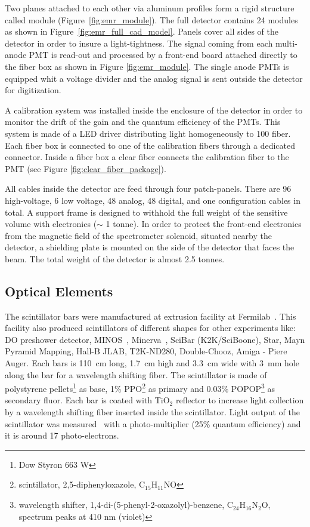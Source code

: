 \documentclass[a4paper,11pt]{article}
\begin{document}
Two planes attached to each other via aluminum profiles form a rigid structure called module (Figure~\ref{fig:emr_module}). 
The full detector contains 24 modules as shown in Figure~\ref{fig:emr_full_cad_model}. Panels cover all sides of the detector
in order to insure a light-tightness. The signal coming from each multi-anode PMT is read-out and processed by a front-end board
attached directly to the fiber box as shown in Figure \ref{fig:emr_module}. The single anode PMTs is equipped whit a
voltage divider and the analog signal is sent outside the detector for digitization.

A calibration system was installed inside the enclosure of the detector in order to monitor the drift of the gain and the quantum
efficiency of the PMTs. This system is made of a LED driver distributing light homogeneously to 100 fiber. Each fiber box is
connected to one of the calibration fibers through a dedicated connector. Inside a fiber box a clear fiber connects the calibration
fiber to the PMT (see Figure \ref{fig:clear_fiber_package}).

All cables inside the detector are feed through four patch-panels. There are 96 high-voltage, 6 low voltage, 48 analog, 48 digital,
and one configuration cables in total. A support frame is designed to withhold the full weight of the sensitive volume with electronics
($\sim$ 1 tonne). In order to protect the front-end electronics from the magnetic field of the spectrometer solenoid, situated nearby
the detector, a shielding plate is mounted on the side of the detector that faces the beam. The total weight of the detector is almost
2.5 tonnes.

\subsection{Optical Elements}
The scintillator bars were manufactured at extrusion facility at Fermilab~\cite{PlaDalmau:2001fr}.
This facility also produced scintillators of different shapes for other experiments like: DO preshower detector, MINOS~\cite{PlaDalmau:2001en},
Minerva~\cite{PlaDalmau:2005df}, SciBar (K2K/SciBoone), Star, Mayn Pyramid Mapping, Hall-B JLAB, T2K-ND280, Double-Chooz, Amiga - Piere Auger.
Each bars is 110~cm long, 1.7~cm high and
3.3~cm wide with 3~mm hole along the bar for a wavelength shifting fiber. The scintillator is made of polystyrene
pellets\footnote{Dow Styron 663 W} as base, 1\% PPO\footnote{scintillator, 2,5-diphenyloxazole, C$_{15}$H$_{11}$NO} as primary and 0.03\% 
POPOP\footnote{wavelength shifter, 1,4-di-(5-phenyl-2-oxazolyl)-benzene, C$_{24}$H$_{16}$N$_{2}$O, spectrum peaks at 410 nm (violet)} 
as secondary fluor. Each bar is coated with TiO$_2$ reflector to increase light collection by a wavelength shifting fiber inserted inside
the scintillator. Light output of the scintillator was measured~\cite{PlaDalmau:2001fr} with a photo-multiplier (25\% quantum efficiency)
and it is around 17 photo-electrons. 
\end{document}

